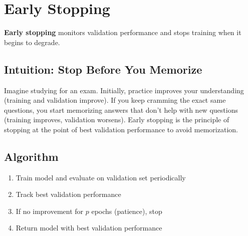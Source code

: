 
\section{Early Stopping}
\label{sec:early-stopping}

\textbf{Early stopping} monitors validation performance and stops training when it begins to degrade.

\subsection{Intuition: Stop Before You Memorize}

Imagine studying for an exam. Initially, practice improves your understanding (training and validation improve). If you keep cramming the exact same questions, you start memorizing answers that don't help with new questions (training improves, validation worsens). Early stopping is the principle of stopping at the point of best validation performance to avoid memorization.

\subsection{Algorithm}

\begin{enumerate}
    \item Train model and evaluate on validation set periodically
    \item Track best validation performance
    \item If no improvement for $p$ epochs (patience), stop
    \item Return model with best validation performance
\end{enumerate}

